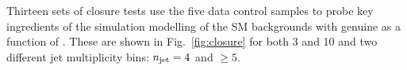 Thirteen sets of closure tests use the five data control samples to
probe key ingredients of the simulation modelling of the SM
backgrounds with genuine \met as a function of \scalht. These are
shown in Fig.~\ref{fig:closure} for both 3 \ifb and 10 \ifb and two
different jet multiplicity bins: $\njet = 4$ and $\geq 5$. 

\begin{figure}[h!]
  \begin{center}
     ~~
     \\
     ~~

\end{center}
\end{figure}

